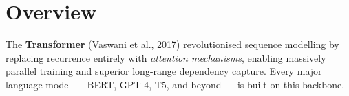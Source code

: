 \section{Overview}

The \textbf{Transformer} (Vaswani et al., 2017) revolutionised sequence modelling
by replacing recurrence entirely with \emph{attention mechanisms}, enabling
massively parallel training and superior long-range dependency capture.
Every major language model — BERT, GPT-4, T5, and beyond — is built on this backbone.

